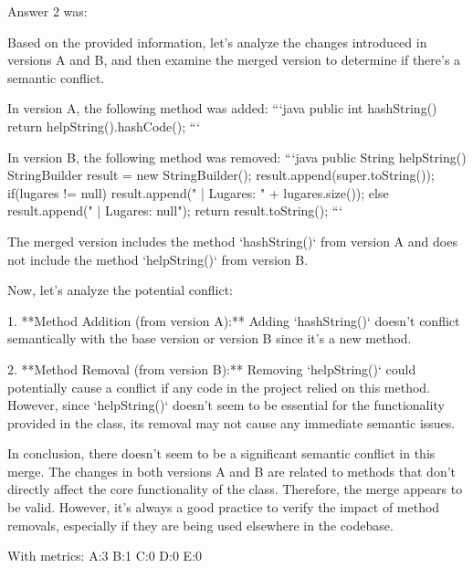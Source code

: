 Answer 2 was:
\begin{spverbatim}
Based on the provided information, let's analyze the changes introduced in versions A and B, and then examine the merged version to determine if there's a semantic conflict.

In version A, the following method was added:
```java
public int hashString(){
    return helpString().hashCode();
}
```

In version B, the following method was removed:
```java
public String helpString(){
    StringBuilder result = new StringBuilder();
    result.append(super.toString());
    if(lugares != null)
        result.append(" | Lugares: " + lugares.size());
    else
        result.append(" | Lugares: null");
    return result.toString();
}
```

The merged version includes the method `hashString()` from version A and does not include the method `helpString()` from version B.

Now, let's analyze the potential conflict:

1. **Method Addition (from version A):** Adding `hashString()` doesn't conflict semantically with the base version or version B since it's a new method.

2. **Method Removal (from version B):** Removing `helpString()` could potentially cause a conflict if any code in the project relied on this method. However, since `helpString()` doesn't seem to be essential for the functionality provided in the class, its removal may not cause any immediate semantic issues.

In conclusion, there doesn't seem to be a significant semantic conflict in this merge. The changes in both versions A and B are related to methods that don't directly affect the core functionality of the class. Therefore, the merge appears to be valid. However, it's always a good practice to verify the impact of method removals, especially if they are being used elsewhere in the codebase.
\end{spverbatim}

With metrics:
A:3
B:1
C:0
D:0
E:0

